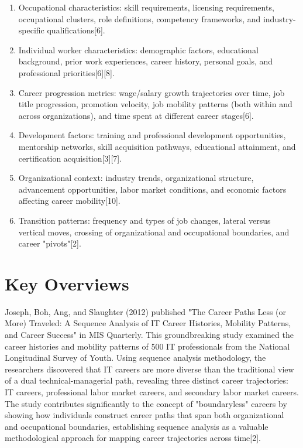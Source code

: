 \documentclass{article}
\begin{document}
\begin{enumerate}
\item Occupational characteristics: skill requirements, licensing requirements, occupational clusters, role definitions, competency frameworks, and industry-specific qualifications[6].

\item Individual worker characteristics: demographic factors, educational background, prior work experiences, career history, personal goals, and professional priorities[6][8].

\item Career progression metrics: wage/salary growth trajectories over time, job title progression, promotion velocity, job mobility patterns (both within and across organizations), and time spent at different career stages[6].

\item Development factors: training and professional development opportunities, mentorship networks, skill acquisition pathways, educational attainment, and certification acquisition[3][7].

\item Organizational context: industry trends, organizational structure, advancement opportunities, labor market conditions, and economic factors affecting career mobility[10].

\item Transition patterns: frequency and types of job changes, lateral versus vertical moves, crossing of organizational and occupational boundaries, and career "pivots"[2].
\end{enumerate}

\section{Key Overviews}

Joseph, Boh, Ang, and Slaughter (2012) published "The Career Paths Less (or More) Traveled: A Sequence Analysis of IT Career Histories, Mobility Patterns, and Career Success" in MIS Quarterly. This groundbreaking study examined the career histories and mobility patterns of 500 IT professionals from the National Longitudinal Survey of Youth. Using sequence analysis methodology, the researchers discovered that IT careers are more diverse than the traditional view of a dual technical-managerial path, revealing three distinct career trajectories: IT careers, professional labor market careers, and secondary labor market careers. The study contributes significantly to the concept of "boundaryless" careers by showing how individuals construct career paths that span both organizational and occupational boundaries, establishing sequence analysis as a valuable methodological approach for mapping career trajectories across time[2].
\end{document}
